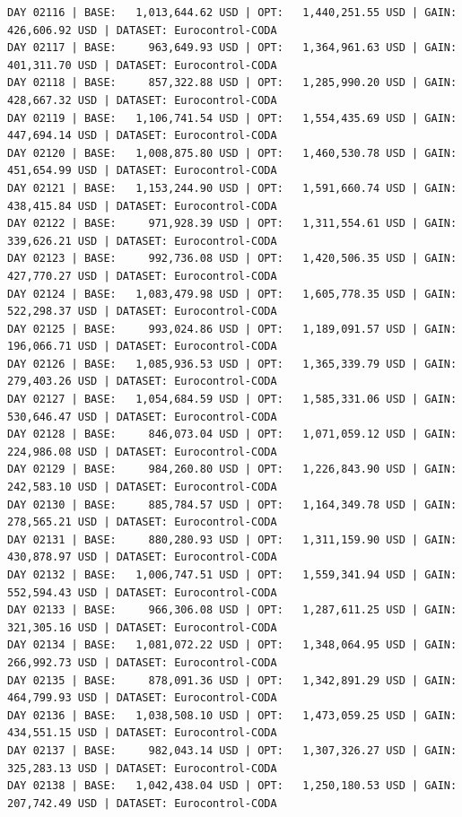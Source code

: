 \documentclass[11pt,a4paper]{article}
\begin{document}
\begin{verbatim}
DAY 02116 | BASE:   1,013,644.62 USD | OPT:   1,440,251.55 USD | GAIN: 426,606.92 USD | DATASET: Eurocontrol-CODA
DAY 02117 | BASE:     963,649.93 USD | OPT:   1,364,961.63 USD | GAIN: 401,311.70 USD | DATASET: Eurocontrol-CODA
DAY 02118 | BASE:     857,322.88 USD | OPT:   1,285,990.20 USD | GAIN: 428,667.32 USD | DATASET: Eurocontrol-CODA
DAY 02119 | BASE:   1,106,741.54 USD | OPT:   1,554,435.69 USD | GAIN: 447,694.14 USD | DATASET: Eurocontrol-CODA
DAY 02120 | BASE:   1,008,875.80 USD | OPT:   1,460,530.78 USD | GAIN: 451,654.99 USD | DATASET: Eurocontrol-CODA
DAY 02121 | BASE:   1,153,244.90 USD | OPT:   1,591,660.74 USD | GAIN: 438,415.84 USD | DATASET: Eurocontrol-CODA
DAY 02122 | BASE:     971,928.39 USD | OPT:   1,311,554.61 USD | GAIN: 339,626.21 USD | DATASET: Eurocontrol-CODA
DAY 02123 | BASE:     992,736.08 USD | OPT:   1,420,506.35 USD | GAIN: 427,770.27 USD | DATASET: Eurocontrol-CODA
DAY 02124 | BASE:   1,083,479.98 USD | OPT:   1,605,778.35 USD | GAIN: 522,298.37 USD | DATASET: Eurocontrol-CODA
DAY 02125 | BASE:     993,024.86 USD | OPT:   1,189,091.57 USD | GAIN: 196,066.71 USD | DATASET: Eurocontrol-CODA
DAY 02126 | BASE:   1,085,936.53 USD | OPT:   1,365,339.79 USD | GAIN: 279,403.26 USD | DATASET: Eurocontrol-CODA
DAY 02127 | BASE:   1,054,684.59 USD | OPT:   1,585,331.06 USD | GAIN: 530,646.47 USD | DATASET: Eurocontrol-CODA
DAY 02128 | BASE:     846,073.04 USD | OPT:   1,071,059.12 USD | GAIN: 224,986.08 USD | DATASET: Eurocontrol-CODA
DAY 02129 | BASE:     984,260.80 USD | OPT:   1,226,843.90 USD | GAIN: 242,583.10 USD | DATASET: Eurocontrol-CODA
DAY 02130 | BASE:     885,784.57 USD | OPT:   1,164,349.78 USD | GAIN: 278,565.21 USD | DATASET: Eurocontrol-CODA
DAY 02131 | BASE:     880,280.93 USD | OPT:   1,311,159.90 USD | GAIN: 430,878.97 USD | DATASET: Eurocontrol-CODA
DAY 02132 | BASE:   1,006,747.51 USD | OPT:   1,559,341.94 USD | GAIN: 552,594.43 USD | DATASET: Eurocontrol-CODA
DAY 02133 | BASE:     966,306.08 USD | OPT:   1,287,611.25 USD | GAIN: 321,305.16 USD | DATASET: Eurocontrol-CODA
DAY 02134 | BASE:   1,081,072.22 USD | OPT:   1,348,064.95 USD | GAIN: 266,992.73 USD | DATASET: Eurocontrol-CODA
DAY 02135 | BASE:     878,091.36 USD | OPT:   1,342,891.29 USD | GAIN: 464,799.93 USD | DATASET: Eurocontrol-CODA
DAY 02136 | BASE:   1,038,508.10 USD | OPT:   1,473,059.25 USD | GAIN: 434,551.15 USD | DATASET: Eurocontrol-CODA
DAY 02137 | BASE:     982,043.14 USD | OPT:   1,307,326.27 USD | GAIN: 325,283.13 USD | DATASET: Eurocontrol-CODA
DAY 02138 | BASE:   1,042,438.04 USD | OPT:   1,250,180.53 USD | GAIN: 207,742.49 USD | DATASET: Eurocontrol-CODA

\end{verbatim}
\end{document}
